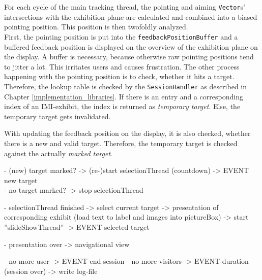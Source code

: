 For each cycle of the main tracking thread, the pointing and aiming \texttt{Vector}s' intersections with the exhibition plane are calculated and combined into a biased pointing position. This position is then twofoldly analyzed.
\\
First, the pointing position is put into the \texttt{feedbackPositionBuffer} and a buffered feedback position is displayed on the overview of the exhibition plane on the display. A buffer is necessary, because otherwise raw pointing positions tend to jitter a lot. This irritates users and causes frustration. 
The other process happening with the pointing position is to check, whether it hits a target. Therefore, the lookup table is checked by the \texttt{SessionHandler} as described in Chapter \ref{implementation_libraries}. If there is an entry and a corresponding index of an \ac{IMI}-exhibit, the index is returned as \textit{temporary target}. Else, the temporary target gets invalidated.

With updating the feedback position on the display, it is also checked, whether there is a new and valid target. Therefore, the temporary target is checked against the actually \textit{marked target}.

- (new) target marked? -> (re-)start selectionThread (countdown) -> EVENT new target
\\
- no target marked? -> stop selectionThread

- selectionThread finished -> select current target -> presentation of corresponding exhibit (load text to label and images into pictureBox) -> start ''slideShowThread'' -> EVENT selected target

- presentation over -> navigational view

- no more user -> EVENT end session
- no more visitors -> EVENT duration (session over) -> write log-file

